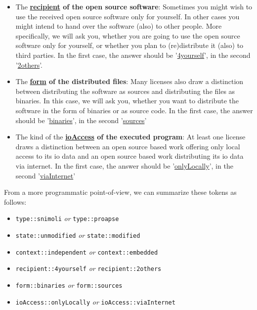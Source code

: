 \begin{itemize}
  \item The \textbf{\underline{recipient} of the open source software}:
  Sometimes you might wish to use the received open source software only for
  yourself. In other cases you might intend to hand over the software (also) to
  other people. More specifically, we will ask you, whether you are going to use
  the open source software only for yourself, or whether you plan to
  (re)distribute it (also) to third parties. In the first case, the answer
  should be '\underline{4yourself}', in the second '\underline{2others}'.
 
  \item The \textbf{\underline{form} of the distributed files}: Many licenses
  also draw a distinction between distributing the software as sources and
  distributing the files as binaries. In this case, we will ask you, whether you
  want to distribute the software in the form of binaries or as source code. In
  the first case, the answer should be '\underline{binaries}', in the second
  '\underline{sources}'
  
  \item The kind of the \textbf{\underline{ioAccess} of the executed program}:
  At least one license draws a distinction between an open source based work
  offering only local access to its io data and an open source based work
  distributing its io data via internet. In the first case, the answer should be
  '\underline{onlyLocally}', in the second '\underline{viaInternet}'
\end{itemize}

From a more programmatic point-of-view, we can summarize these tokens as
follows:

\begin{itemize}
  \item \texttt{type::snimoli} \emph{or} \texttt{type::proapse}
  \item \texttt{state::unmodified} \emph{or} \texttt{state::modified}
  \item \texttt{context::independent} \emph{or} \texttt{context::embedded}
  \item \texttt{recipient::4yourself} \emph{or} \texttt{recipient::2others}
  \item \texttt{form::binaries} \emph{or} \texttt{form::sources}
  \item \texttt{ioAccess::onlyLocally} \emph{or} \texttt{ioAccess::viaInternet}
\end{itemize}

